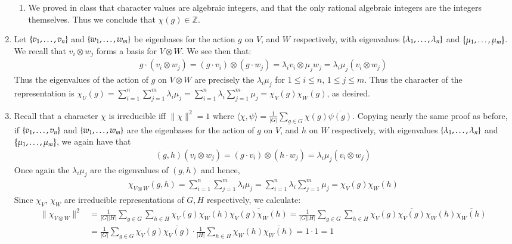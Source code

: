 \documentclass[12pt]{article}
\theoremstyle{definitionstyle}
\def\mbb#1{\mathbb{#1}}
\newcommand{\mg}[1]{\| #1 \|}
\renewcommand{\ip}[1]{\langle #1 \rangle}
\newcommand{\SET}[1]{\Set{\mskip-\medmuskip #1 \mskip-\medmuskip}}
\newcommand{\Z}{\mbb Z}
\begin{document}
\begin{enumerate}
\begin{enumerate}
            \item We proved in class that character values are algebraic integers, and that the only rational algebraic integers are the integers themselves. Thus we conclude that $\chi(g) \in \Z$.
        \end{enumerate}

        \item Let $\SET{v_1, \ldots, v_n}$ and $\SET{w_1, \ldots, w_m}$ be eigenbases for the action $g$ on $V$, and $W$ respectively, with eigenvalues $\SET{\lambda_1, \ldots, \lambda_n}$ and $\SET{\mu_1, \ldots, \mu_m}$. We recall that $v_i \otimes w_j$ forms a basis for $V \otimes W$. We see then that:
        \begin{align*}
            g \cdot (v_i \otimes w_j) = (g \cdot v_i) \otimes (g \cdot w_j) = \lambda_i v_i \otimes \mu_j w_j = \lambda_i \mu_j (v_i \otimes w_j)
        \end{align*}
        Thus the eigenvalues of the action of $g$ on $V \otimes W$ are precisely the $\lambda_i \mu_j$ for $1 \leq i \leq n$, $1 \leq j \leq m$. Thus the character of the representation is $\chi_U(g) = \sum_{i=1}^n \sum_{j=1}^m \lambda_i \mu_j = \sum_{i=1}^n \lambda_i \sum_{j=1}^m \mu_j = \chi_V(g) \chi_W(g)$, as desired.

        \item Recall that a character $\chi$ is irreducible iff $\mg{\chi}^2 = 1$ where $\ip{\chi, \psi} = \frac{1}{|G|} \sum_{g \in G} \chi(g) \overline{\psi(g)}$. Copying nearly the same proof as before, if $\SET{v_1, \ldots, v_n}$ and $\SET{w_1, \ldots, w_m}$ are the eigenbases for the action of $g$ on $V$, and $h$ on $W$ respectively, with eigenvalues $\SET{\lambda_1, \ldots, \lambda_n}$ and $\SET{\mu_1, \ldots, \mu_m}$, we again have that
        \begin{align*}
            (g,h)(v_i \otimes w_j) = (g \cdot v_i) \otimes (h \cdot w_j) = \lambda_i \mu_j (v_i \otimes w_j)
        \end{align*}
        Once again the $\lambda_i\mu_j$ are the eigenvalues of $(g,h)$ and hence,
        \begin{align*}
            \chi_{V \otimes W}(g,h) = \sum_{i=1}^n \sum_{j=1}^m \lambda_i \mu_j = \sum_{i=1}^n \lambda_i \sum_{j=1}^m \mu_j = \chi_V(g) \chi_W(h)
        \end{align*}
        Since $\chi_V$, $\chi_W$ are irreducible representations of $G,H$ respectively, we calculate:
        \begin{align*}
            \mg{\chi_{V \otimes W}}^2 &= \frac{1}{|G| |H|} \sum_{g \in G} \sum_{h \in H} \chi_V(g) \chi_W(h) \overline{\chi_V(g) \chi_W(h)} = \frac{1}{|G| |H|} \sum_{g \in G} \sum_{h \in H} \chi_V(g) \overline{\chi_V(g)} \chi_W(h) \overline{\chi_W(h)} \\
            &= \frac{1}{|G|}\sum_{g \in G} \chi_V(g) \overline{\chi_V(g)} \cdot \frac{1}{|H|} \sum_{h \in H} \chi_W(h) \overline{\chi_W(h)} = 1 \cdot 1 = 1
        \end{align*}


\end{enumerate}
\end{document}

